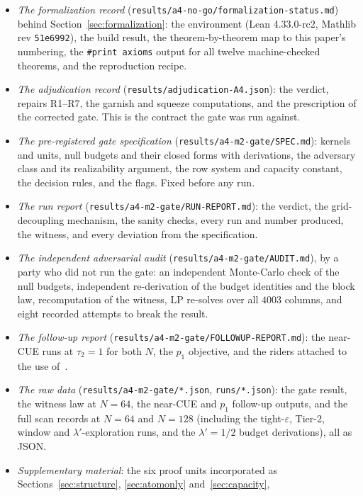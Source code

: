 \documentclass[11pt]{article}
\theoremstyle{plain}
\theoremstyle{definition}
\theoremstyle{remark}
\begin{document}
\begin{itemize}
\item \emph{The formalization record} (\texttt{results/a4-no-go/formalization-status.md})
  behind Section~\ref{sec:formalization}: the
  environment (Lean 4.33.0-rc2, Mathlib rev \texttt{51e6992}), the build result,
  the theorem-by-theorem map to this paper's numbering, the
  \texttt{\#print axioms} output for all twelve machine-checked theorems, and the
  reproduction recipe.
\item \emph{The adjudication record} (\texttt{results/adjudication-A4.json}): the verdict, repairs R1--R7, the
  garnish and squeeze computations, and the prescription of the corrected gate.
  This is the contract the gate was run against.
\item \emph{The pre-registered gate specification} (\texttt{results/a4-m2-gate/SPEC.md}): kernels and units, null
  budgets and their closed forms with derivations, the adversary class and its
  realizability argument, the row system and capacity constant, the decision
  rules, and the flags. Fixed before any run.
\item \emph{The run report} (\texttt{results/a4-m2-gate/RUN-REPORT.md}): the verdict, the grid-decoupling mechanism, the
  sanity checks, every run and number produced, the witness, and every deviation
  from the specification.
\item \emph{The independent adversarial audit} (\texttt{results/a4-m2-gate/AUDIT.md}), by a party who did not run
  the gate: an independent Monte-Carlo check of the null budgets, independent
  re-derivation of the budget identities and the block law, recomputation of the
  witness, LP re-solves over all $4003$ columns, and eight recorded attempts to
  break the result.
\item \emph{The follow-up report} (\texttt{results/a4-m2-gate/FOLLOWUP-REPORT.md}): the near-CUE runs at $\tau_2 = 1$ for both
  $N$, the $p_1$ objective, and the riders attached to the use
  of~\cite{BGSTB24}.
\item \emph{The raw data} (\texttt{results/a4-m2-gate/*.json}, \texttt{runs/*.json}): the gate result, the witness law at $N = 64$, the
  near-CUE and $p_1$ follow-up outputs, and the full scan records at $N = 64$ and
  $N = 128$ (including the tight-$\varepsilon$, Tier-2, window and
  $\lambda'$-exploration runs, and the $\lambda' = 1/2$ budget derivations), all
  as JSON.
\item \emph{Supplementary material}: the six proof units incorporated as
  Sections~\ref{sec:structure}, \ref{sec:atomonly} and~\ref{sec:capacity},

\end{itemize}
\end{document}

